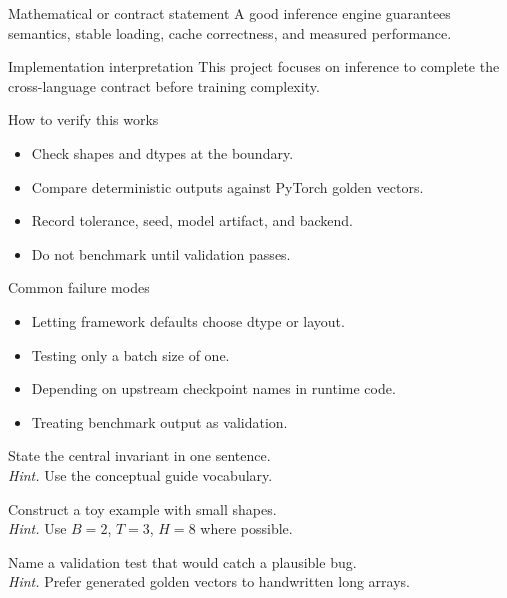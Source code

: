 \begin{definitionbox}{Mathematical or contract statement}
A good inference engine guarantees semantics, stable loading, cache correctness, and measured performance.
\end{definitionbox}

\begin{implementationbox}{Implementation interpretation}
This project focuses on inference to complete the cross-language contract before training complexity.
\end{implementationbox}

\begin{verificationbox}{How to verify this works}
\begin{itemize}
\item Check shapes and dtypes at the boundary.
\item Compare deterministic outputs against PyTorch golden vectors.
\item Record tolerance, seed, model artifact, and backend.
\item Do not benchmark until validation passes.
\end{itemize}
\end{verificationbox}

\begin{warningbox}{Common failure modes}
\begin{itemize}
\item Letting framework defaults choose dtype or layout.
\item Testing only a batch size of one.
\item Depending on upstream checkpoint names in runtime code.
\item Treating benchmark output as validation.
\end{itemize}
\end{warningbox}

\begin{chapterexercises}
\item State the central invariant in one sentence.\\
\textit{Hint.} Use the conceptual guide vocabulary.
\item Construct a toy example with small shapes.\\
\textit{Hint.} Use $B=2$, $T=3$, $H=8$ where possible.
\item Name a validation test that would catch a plausible bug.\\
\textit{Hint.} Prefer generated golden vectors to handwritten long arrays.
\end{chapterexercises}
